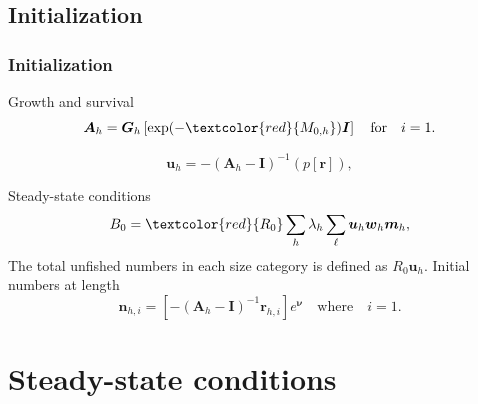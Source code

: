 \documentclass{beamer}
\begin{document}
\subsection{Initialization}
\begin{frame}
\frametitle{Initialization}
Growth and survival
\begin{equation*}
  \boldsymbol{A}_{h} = \boldsymbol{G}_h \left[ \exp (-\textcolor{red}{M_{0,h}})
    \boldsymbol{I} \right] \quad \text{for} \quad i=1.
\end{equation*}

\begin{equation*}
  \boldsymbol{u}_h = -(\boldsymbol{A}_h - \boldsymbol{I})^{-1} (p[\boldsymbol{r}]),
\end{equation*}

Steady-state conditions
\begin{equation*}
  B_0 = \textcolor{red}{R_0} \sum_h \lambda_h \sum_\ell \boldsymbol{u}_h
  \boldsymbol{w}_{h} \boldsymbol{m}_{h},
\end{equation*}
The total unfished numbers in each size category is defined as $R_0
\boldsymbol{u}_h$. Initial numbers at length
\begin{equation*}
  \boldsymbol{n}_{h,i} = \left[-\left( \boldsymbol{A}_{h} - \boldsymbol{I}
    \right)^{-1} \boldsymbol{r}_{h,i} \right] e^{\boldsymbol\nu} \quad
  \text{where} \quad i=1.
\end{equation*}
\end{frame}





\section{Steady-state conditions}

\end{document}
